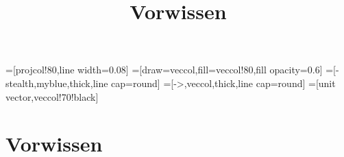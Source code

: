 
\usepackage{tikz-3dplot}
\usepackage[outline]{contour} %
\tikzset{>=latex} %
=[projcol!80,line width=0.08] %
=[draw=veccol,fill=veccol!80,fill opacity=0.6]
=[-stealth,myblue,thick,line cap=round]
=[->,veccol,thick,line cap=round]
=[unit vector,veccol!70!black]
\usetikzlibrary{angles,quotes} %
\contourlength{1.3pt}

\title[TET: Vorwissen]{Vorwissen}


% 
% 

\maketitle

% 
% 
\section{Vorwissen}

